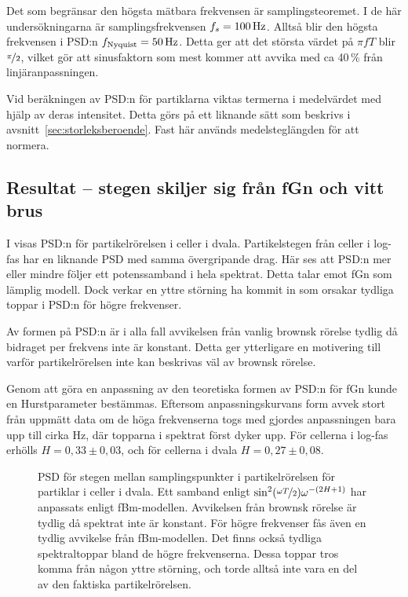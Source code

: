 Det som begränsar den högsta mätbara frekvensen är samplingsteoremet. I de här undersökningarna är samplingsfrekvensen $f_s=\unit[100]{Hz}$. Alltså blir den högsta frekvensen i PSD:n $f_\text{Nyquist}=\unit[50]{Hz}$. Detta ger att det största värdet på $\pi f T$ blir $\nicefrac{\pi}{2}$, vilket gör att sinusfaktorn som mest kommer att avvika med ca 40\,\% från linjäranpassningen.

Vid beräkningen av PSD:n för partiklarna viktas termerna i medelvärdet med hjälp av deras intensitet. Detta görs på ett liknande sätt som beskrivs i avsnitt~\ref{sec:storleksberoende}. Fast här används medelsteglängden för att normera.


\subsection{Resultat -- stegen skiljer sig från fGn och vitt brus}


I  visas PSD:n för partikelrörelsen i celler i dvala. Partikelstegen från celler i log-fas har en liknande PSD med samma övergripande drag. 
Här ses att PSD:n mer eller mindre följer ett potenssamband i hela spektrat. Detta talar emot fGn som lämplig modell. Dock verkar en yttre störning ha kommit in som orsakar tydliga toppar i PSD:n för högre frekvenser.

Av formen på PSD:n är i alla fall avvikelsen från vanlig brownsk rörelse tydlig då bidraget per frekvens inte är konstant. Detta ger ytterligare en motivering till varför partikelrörelsen inte kan beskrivas väl av brownsk rörelse. 

Genom att göra en anpassning av den teoretiska formen av PSD:n för fGn kunde en Hurstparameter bestämmas. Eftersom anpassningskurvans form avvek stort från uppmätt data om de höga frekvenserna togs med gjordes anpassningen bara upp till cirka \unit[20]{Hz}, där topparna i spektrat först dyker upp.
För cellerna i log-fas erhölls $H=0,33\pm 0,03$, och för cellerna i dvala $H=0,27\pm 0,08$.


\begin{figure}
\centering

\caption{PSD för stegen mellan samplingspunkter i partikelrörelsen för partiklar i celler i dvala. Ett samband enligt $\sin^2(\nicefrac{\omega T}{2})\omega^{-(2H+1)}$ har anpassats enligt fBm-modellen. Avvikelsen från brownsk rörelse är tydlig då spektrat inte är konstant. För högre frekvenser fås även en tydlig avvikelse från fBm-modellen. Det finns också tydliga spektraltoppar bland de högre frekvenserna. Dessa toppar tros komma från någon yttre störning, och torde alltså inte vara en del av den faktiska partikelrörelsen. }
\label{fig:fGn_PSD}
\end{figure}

